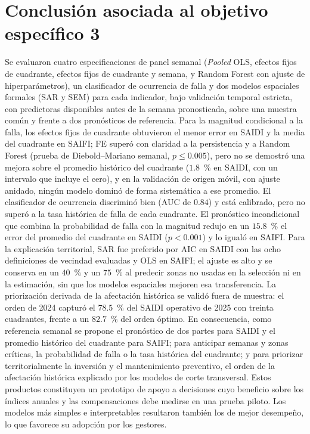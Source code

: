 \section{Conclusión asociada al objetivo específico 3}

Se evaluaron cuatro especificaciones de panel semanal (\emph{Pooled} OLS, efectos fijos de cuadrante, efectos fijos de cuadrante y semana, y Random Forest con ajuste de hiperparámetros), un clasificador de ocurrencia de falla y dos modelos espaciales formales (SAR y SEM) para cada indicador, bajo validación temporal estricta, con predictoras disponibles antes de la semana pronosticada, sobre una muestra común y frente a dos pronósticos de referencia. Para la magnitud condicional a la falla, los efectos fijos de cuadrante obtuvieron el menor error en SAIDI y la media del cuadrante en SAIFI; FE superó con claridad a la persistencia y a Random Forest (prueba de Diebold--Mariano semanal, $p\leq0{.}005$), pero no se demostró una mejora sobre el promedio histórico del cuadrante ($1{.}8$~\% en SAIDI, con un intervalo que incluye el cero), y en la validación de origen móvil, con ajuste anidado, ningún modelo dominó de forma sistemática a ese promedio. El clasificador de ocurrencia discriminó bien (AUC de $0{.}84$) y está calibrado, pero no superó a la tasa histórica de falla de cada cuadrante. El pronóstico incondicional que combina la probabilidad de falla con la magnitud redujo en un $15{.}8$~\% el error del promedio del cuadrante en SAIDI ($p<0{.}001$) y lo igualó en SAIFI. Para la explicación territorial, SAR fue preferido por AIC en SAIDI con las ocho definiciones de vecindad evaluadas y OLS en SAIFI; el ajuste es alto y se conserva en un $40$~\% y un $75$~\% al predecir zonas no usadas en la selección ni en la estimación, sin que los modelos espaciales mejoren esa transferencia. La priorización derivada de la afectación histórica se validó fuera de muestra: el orden de 2024 capturó el $78{.}5$~\% del SAIDI operativo de 2025 con treinta cuadrantes, frente a un $82{.}7$~\% del orden óptimo. En consecuencia, como referencia semanal se propone el pronóstico de dos partes para SAIDI y el promedio histórico del cuadrante para SAIFI; para anticipar semanas y zonas críticas, la probabilidad de falla o la tasa histórica del cuadrante; y para priorizar territorialmente la inversión y el mantenimiento preventivo, el orden de la afectación histórica explicado por los modelos de corte transversal. Estos productos constituyen un prototipo de apoyo a decisiones cuyo beneficio sobre los índices anuales y las compensaciones debe medirse en una prueba piloto. Los modelos más simples e interpretables resultaron también los de mejor desempeño, lo que favorece su adopción por los gestores.

